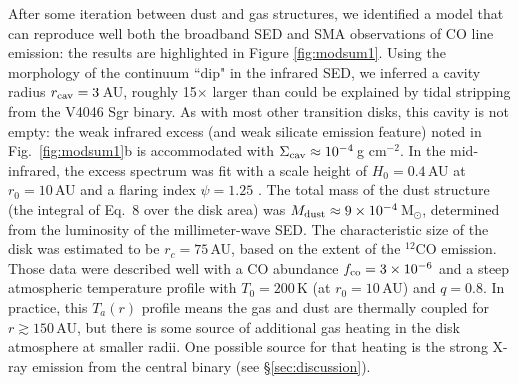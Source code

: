 {After some iteration between dust and gas structures, we identified a model
that can reproduce well both the broadband SED and SMA observations of CO line
emission: the results are highlighted in Figure \ref{fig:modsum1}.  Using the 
morphology of the continuum ``dip" in the infrared SED, we inferred a cavity 
radius $r_{\rm cav} = 3$\,AU, roughly 15$\times$ larger than could be explained 
by tidal stripping from the V4046 Sgr binary.  As with most other transition 
disks, this cavity is not empty: the weak infrared excess (and weak silicate 
emission feature) noted in Fig.~\ref{fig:modsum1}b is accommodated with 
$\Sigma_{\rm cav} \approx 10^{-4}$\,g cm$^{-2}$.  In the mid-infrared, the 
excess spectrum was fit with a scale height of $H_0 = 0.4$\,AU at $r_0 = 
10$\,AU and a flaring index $\psi = 1.25$ \citep[although the latter is not 
well-determined in transition disks; see][]{andrews11}.  The total mass of the 
dust structure (the integral of Eq.~8 over the disk area) was $M_{\rm dust} 
\approx 9\times10^{-4}$\,M$_{\odot}$, determined from the luminosity of the 
millimeter-wave SED.  The characteristic size of the disk was estimated to be 
$r_c = 75$\,AU, based on the extent of the $^{12}$CO emission.  Those data were 
described well with a CO abundance $f_{\rm co} = 3\times10^{-6}$ and a steep 
atmospheric temperature profile with $T_0 = 200$\,K (at $r_0 = 10$\,AU) and 
$q = 0.8$.  In practice, this $T_a(r)$ profile means the gas and dust are 
thermally coupled for $r \gtrsim 150$\,AU, but there is some source of 
additional gas heating in the disk atmosphere at smaller radii.  One possible 
source for that heating is the strong X-ray emission from the central binary 
(see \S\ref{sec:discussion}).

}
